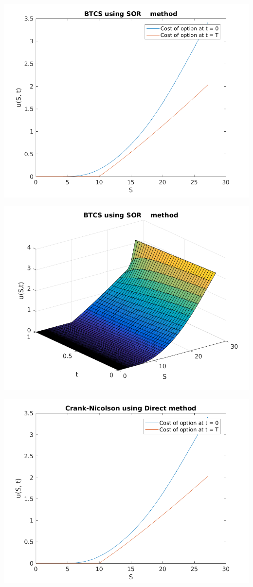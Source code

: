 \documentclass{article}
\begin{document}
\includegraphics{"q1_9"}
\pagebreak


\includegraphics{"q1_10"}
\pagebreak


\includegraphics{"q1_11"}
\pagebreak
\end{document}
